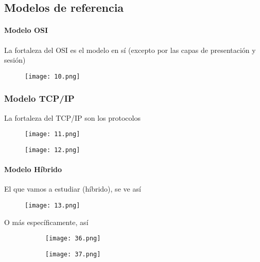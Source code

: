 \documentclass{book}
\begin{document}
	\subsection{Modelos de referencia}
	\paragraph{Modelo OSI}
	La fortaleza del OSI es el modelo en sí (excepto por las capas de presentación y sesión)
	\begin{figure}[H]
		\centering
		\texttt{[image: 10.png]}
	\end{figure}
	
	\pagebreak
	\subsubsection{Modelo TCP/IP}
	La fortaleza del TCP/IP son los protocolos
	\begin{figure}[H]
		\centering
		\texttt{[image: 11.png]}
	\end{figure}
	
	\begin{figure}[H]
		\centering
		\texttt{[image: 12.png]}
	\end{figure}
	\paragraph{Modelo Híbrido}
	El que vamos a estudiar (híbrido), se ve así
	
	\begin{figure}[H]
		\centering
		\texttt{[image: 13.png]}
	\end{figure}
	
	O más específicamente, así
	
	\begin{figure}[H]
		\centering
		\begin{subfigure}{0.4\textwidth}
			\centering
			\texttt{[image: 36.png]}
		\end{subfigure}
		\qquad
		\begin{subfigure}{0.4\textwidth}
			\centering
			\texttt{[image: 37.png]}
		\end{subfigure}
	\end{figure}
	
\end{document}
